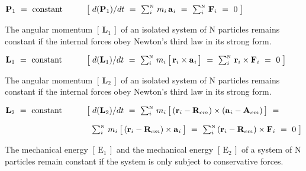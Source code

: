 \documentclass[10pt]{article}
\begin{document}
\par \bigskip\medskip ${\mathbf{P}}_1 ~=~ {\mathrm{constant}} \hspace{+2.88em} \big [ \; d({\mathbf{P}}_1)/dt ~=~ \sum_i^{\scriptscriptstyle{\mathrm{N}}} \, m_i \, {\mathbf{a}}_{\hspace{+0.045em}i} ~=~ \sum_i^{\scriptscriptstyle{\mathrm{N}}} \, {\mathbf{F}}_i ~=~ 0 \; \big ]$

\par \bigskip\medskip \noindent The angular momentum $[ \, {\mathbf{L}}_1 \, ]$ of an isolated system of N particles remains constant if the internal forces obey Newton's third law in its strong form.

\par \bigskip\medskip ${\mathbf{L}}_1 ~=~ {\mathrm{constant}} \hspace{+2.97em} \big [ \; d({\mathbf{L}}_1)/dt ~=~ \sum_i^{\scriptscriptstyle{\mathrm{N}}} \, m_i \, \big [ \, {\mathbf{r}}_i \times {\mathbf{a}}_{\hspace{+0.045em}i} \, \big ]~=~ \sum_i^{\scriptscriptstyle{\mathrm{N}}} \, {\mathbf{r}}_i \times {\mathbf{F}}_i ~=~ 0 \; \big ]$

\par \bigskip\medskip \noindent The angular momentum $[ \, {\mathbf{L}}_2 \, ]$ of an isolated system of N particles remains constant if the internal forces obey Newton's third law in its strong form.

\par \bigskip\medskip ${\mathbf{L}}_2 ~=~ {\mathrm{constant}} \hspace{+2.97em} \big [ \; d({\mathbf{L}}_2)/dt ~=~ \sum_i^{\scriptscriptstyle{\mathrm{N}}} \, m_i \, \big [ \, ({\mathbf{r}}_i - {\mathbf{R}}_{cm}) \times ({\mathbf{a}}_{\hspace{+0.045em}i} - {\mathbf{A}}_{cm}) \, \big ] ~=~$

\par \bigskip $\hspace{+10.44em} \sum_i^{\scriptscriptstyle{\mathrm{N}}} \, m_i \, \big [ \, ({\mathbf{r}}_i - {\mathbf{R}}_{cm}) \times {\mathbf{a}}_{\hspace{+0.045em}i} \, \big ] ~=~ \sum_i^{\scriptscriptstyle{\mathrm{N}}} \, ({\mathbf{r}}_i - {\mathbf{R}}_{cm}) \times {\mathbf{F}}_i ~=~ 0 \; \big ]$

\par \bigskip\medskip \noindent The mechanical energy $[ \, {\mathrm{E}}_1 \, ]$ and the mechanical energy $[ \, {\mathrm{E}}_2 \, ]$ of a system of N particles remain constant if the system is only subject to conservative forces.
\end{document}
